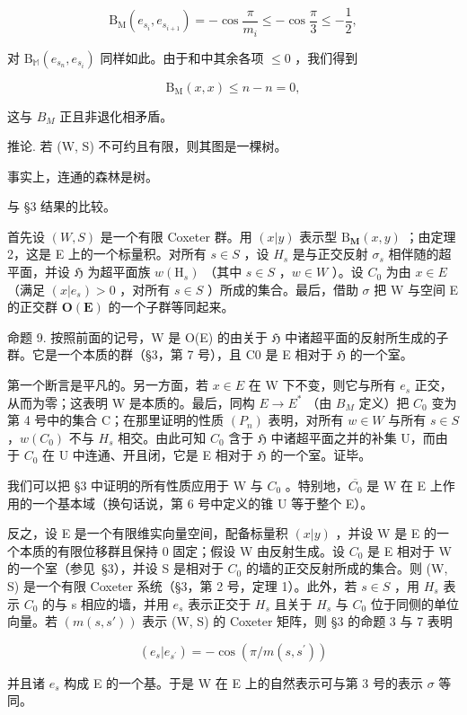 \[
\mathrm{B} _ {\mathrm{M}} (e _ {s _ {i}}, e _ {s _ {i + 1}}) = - \cos \frac {\pi}{m _ {i}} \leqslant - \cos \frac {\pi}{3} \leqslant - \frac {1}{2},
\]

对 \(\mathrm{B}_{\mathbb{M}}(e_{s_n}, e_{s_i})\) 同样如此。由于和中其余各项 \(\leqslant 0\) ，我们得到

\[
\mathrm{B} _ {\mathrm{M}} (x, x) \leqslant n - n = 0,
\]

这与 \(B_{M}\) 正且非退化相矛盾。

推论. 若 (W, S) 不可约且有限，则其图是一棵树。

事实上，连通的森林是树。

与 §3 结果的比较。

首先设 \((W,S)\) 是一个有限 Coxeter 群。用 \((x|y)\) 表示型 \(\mathrm{B}_{\mathbf{M}}(x,y)\) ；由定理 2，这是 E 上的一个标量积。对所有 \(s \in S\) ，设 \(H_{s}\) 是与正交反射 \(\sigma_{s}\) 相伴随的超平面，并设 \(\mathfrak{H}\) 为超平面族 \(w(\mathrm{H}_{s})\) （其中 \(s \in S\) ，\(w \in W\) ）。设 \(C_{0}\) 为由 \(x \in E\) （满足 \((x|e_{s}) > 0\) ，对所有 \(s \in S\) ）所成的集合。最后，借助 \(\sigma\) 把 W 与空间 E 的正交群 \(\mathbf{O}(\mathbf{E})\) 的一个子群等同起来。

命题 9. 按照前面的记号，W 是 O(E) 的由关于 \(\mathfrak{H}\) 中诸超平面的反射所生成的子群。它是一个本质的群（§3，第 7 号），且 C0 是 E 相对于 \(\mathfrak{H}\) 的一个室。

第一个断言是平凡的。另一方面，若 \(x \in E\) 在 W 下不变，则它与所有 \(e_{s}\) 正交，从而为零；这表明 W 是本质的。最后，同构 \(E \to E^{*}\) （由 \(B_{M}\) 定义）把 \(C_{0}\) 变为第 4 号中的集合 C；在那里证明的性质 \((P_{n})\) 表明，对所有 \(w \in W\) 与所有 \(s \in S\) ，\(w(C_0)\) 不与 \(H_s\) 相交。由此可知 \(C_0\) 含于 \(\mathfrak{H}\) 中诸超平面之并的补集 U，而由于 \(C_0\) 在 U 中连通、开且闭，它是 E 相对于 \(\mathfrak{H}\) 的一个室。证毕。

我们可以把 §3 中证明的所有性质应用于 W 与 \(C_{0}\) 。特别地，\(\overline{C_{0}}\) 是 W 在 E 上作用的一个基本域（换句话说，第 6 号中定义的锥 U 等于整个 E）。

反之，设 E 是一个有限维实向量空间，配备标量积 \((x|y)\) ，并设 W 是 E 的一个本质的有限位移群且保持 0 固定；假设 W 由反射生成。设 \(C_{0}\) 是 E 相对于 W 的一个室（参见~§3），并设 S 是相对于 \(C_{0}\) 的墙的正交反射所成的集合。则 (W, S) 是一个有限 Coxeter 系统（§3，第 2 号，定理 1）。此外，若 \(s \in S\) ，用 \(H_{s}\) 表示 \(C_{0}\) 的与 s 相应的墙，并用 \(e_{s}\) 表示正交于 \(H_{s}\) 且关于 \(H_{s}\) 与 \(C_{0}\) 位于同侧的单位向量。若 \((m(s, s'))\) 表示 (W, S) 的 Coxeter 矩阵，则 §3 的命题 3 与 7 表明

\[
(e _ {s} | e _ {s ^ {\prime}}) = - \cos (\pi / m (s, s ^ {\prime}))
\]

并且诸 \(e_{s}\) 构成 E 的一个基。于是 W 在 E 上的自然表示可与第 3 号的表示 \(\sigma\) 等同。

